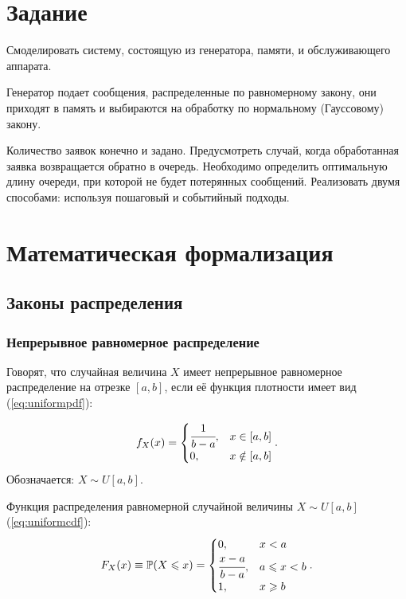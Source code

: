 \chapter{Задание}
Смоделировать систему, состоящую из генератора, памяти, и обслуживающего аппарата. 

Генератор подает сообщения, распределенные по равномерному закону, они приходят в память и выбираются на обработку по нормальному (Гауссовому) закону.


Количество заявок конечно и задано. Предусмотреть случай, когда обработанная заявка возвращается обратно в очередь. Необходимо определить оптимальную длину очереди, при которой не будет потерянных сообщений. Реализовать двумя способами: используя пошаговый и событийный подходы.


\chapter{Математическая формализация}

\section{Законы распределения}

\subsection{Непрерывное равномерное распределение}
Говорят, что случайная величина $X$ имеет непрерывное равномерное распределение на отрезке $\displaystyle [a,b]$, если её  функция плотности имеет вид (\ref{eq:uniformpdf}):

\begin{equation}\label{eq:uniformpdf}
	f_{X}(x) = \begin{cases}
		\cfrac{1}{b - a}, & x \in [a,b] \\
		0, & x \notin [a,b] \\
	\end{cases}.
\end{equation}
Обозначается: $X\sim U[a,b]$.

\noindent Функция распределения равномерной случайной величины  $X\sim U[a,b]$ (\ref{eq:uniformcdf}):
\begin{equation}\label{eq:uniformcdf}
	F_{X}(x)\equiv \mathbb {P} (X\leqslant x) = 
	\begin{cases}
		0, & x < a \\
		\cfrac{x - a}{b - a}, & a\leqslant x < b \\
		1, & x\geqslant b
	\end{cases}.
\end{equation}

